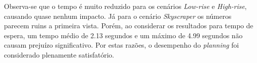 Observa-se que o tempo é muito reduzido para os cenários \textit{Low-rise} e
\textit{High-rise}, causando quase nenhum impacto. Já para o cenário
\textit{Skyscraper} os números parecem ruins a primeira vista. Porém, ao
considerar os resultados para tempo de espera, um tempo médio de 2.13 segundos e
um máximo de 4.99 segundos não causam prejuízo significativo. Por estas razões,
o desempenho do \textit{planning} foi considerado plenamente satisfatório.

